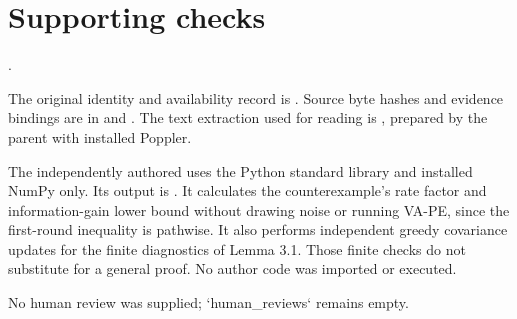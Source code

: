 \documentclass[10pt]{article}
\begin{document}
\section*{Supporting checks}
.\par
The original identity and availability record is . Source byte hashes and evidence bindings are in and . The text extraction used for reading is , prepared by the parent with installed Poppler.\par
The independently authored uses the Python standard library and installed NumPy only. Its output is . It calculates the counterexample’s rate factor and information-gain lower bound without drawing noise or running VA-PE, since the first-round inequality is pathwise. It also performs independent greedy covariance updates for the finite diagnostics of Lemma 3.1. Those finite checks do not substitute for a general proof. No author code was imported or executed.\par
No human review was supplied; `human\_reviews` remains empty.\par
\end{document}
